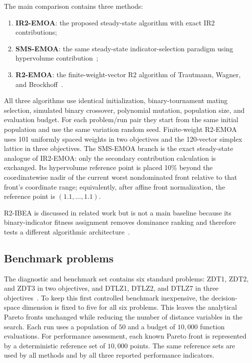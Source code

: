 \documentclass[runningheads]{llncs}
\begin{document}
The main comparison contains three methods:
\begin{enumerate}
    \item \textbf{IR2-EMOA}: the proposed steady-state algorithm with exact IR2 contributions;
    \item \textbf{SMS-EMOA}: the same steady-state indicator-selection paradigm using hypervolume contribution~\cite{BeumeNaujoksEmmerich2007};
    \item \textbf{R2-EMOA}: the finite-weight-vector R2 algorithm of Trautmann, Wagner, and Brockhoff~\cite{TrautmannWagnerBrockhoff2013}.
\end{enumerate}
All three algorithms use identical initialization, binary-tournament mating selection, simulated binary crossover, polynomial mutation, population size, and evaluation budget. For each problem/run pair they start from the same initial population and use the same variation random seed. Finite-weight R2-EMOA uses 101 uniformly spaced weights in two objectives and the 120-vector simplex lattice in three objectives. The SMS-EMOA branch is the exact steady-state analogue of IR2-EMOA: only the secondary contribution calculation is exchanged. Its hypervolume reference point is placed 10\% beyond the coordinatewise nadir of the current worst nondominated front relative to that front's coordinate range; equivalently, after affine front normalization, the reference point is $(1.1,\ldots,1.1)$.

R2-IBEA is discussed in related work but is not a main baseline because its binary-indicator fitness assignment removes dominance ranking and therefore tests a different algorithmic architecture~\cite{PhanSuzuki2013}.

\subsection{Benchmark problems}

The diagnostic and benchmark set contains six standard problems: ZDT1, ZDT2, and ZDT3 in two objectives, and DTLZ1, DTLZ2, and DTLZ7 in three objectives~\cite{DebThieleLaumannsZitzler2002}. To keep this first controlled benchmark inexpensive, the decision-space dimension is fixed to five for all six problems. This leaves the analytical Pareto fronts unchanged while reducing the number of distance variables in the search. Each run uses a population of $50$ and a budget of $10{,}000$ function evaluations. For performance assessment, each known Pareto front is represented by a deterministic reference set of $10{,}000$ points. The same reference sets are used by all methods and by all three reported performance indicators.
\end{document}
